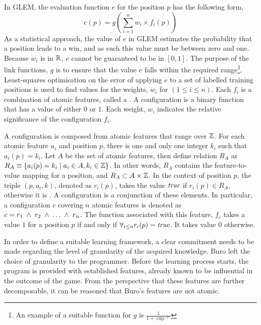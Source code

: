 In GLEM, the evaluation function $e$ for the position $p$  has the following form,
\[
e(p) = g(\sum_{i=1}^n w_i \times f_i(p))
\]
As a statistical approach, the value of $e$ in GLEM estimates the probability that a position leads to a win, and as such this value must be between zero and one.  Because $w_i$ is in ${\mathbb R}$, $e$ cannot be guaranteed to be in $[0,1]$. The purpose of the link functions, $g$ is to ensure that the value $e$ falls within the required range\footnote{An example of a suitable function for $g$ is $\frac{1} {1+\exp^{-x}}$}. Least-squares optimisation on the error of applying $e$  to a set of labelled training positions is used to find values for the weights, $w_i$ for $(1 \leq i \leq n)$. Each $f_i$ is a combination of atomic features, called a .  A configuration is a binary function that has a value of either $0$ or $1$.  Each weight, $w_i$ indicates the relative significance of the configuration $f_i$.  

A configuration is composed from atomic features that range over  $\mathbb Z$. For each atomic feature $a_i$ and position $p$, there is one and only one integer $k_i$ such that  $a_i(p) = k_i$.  Let $A$ be the set of atomic features, then define relation $R_A$ as $R_A \equiv \{ a_i(p) = k_i \; | \; a_i  \in A, k_i \in \mathbb Z\}$. In other words, $R_A$ contains the feature-to-value mapping for a position, and $R_A \subset A \times \mathbb Z$. In the context of  position $p$, the \label{glem_triple} triple $(p,a_i,k)$, denoted as $r_i(p)$, takes the value $\mbox{\it true}$  if $r_i(p) \in R_A$, otherwise it is \myfalse.  A configuration  is a conjunction of these elements.  In particular, a configuration $c$ covering $n$ atomic features is denoted as $c =  r_1 \;\wedge\;  r_2 \;\wedge\; \ldots \;\wedge\; r_n$.   The function associated with this feature, $f_c$ takes a value $1$ for a position $p$ if and only if $\forall_{i\leq n} r_i(p) = \mbox{\mbox{\it true}}$.  It takes value $0$ otherwise. 

In order to define a suitable learning framework, a clear commitment needs to be made regarding the level of granularity of the acquired knowledge. Buro left the choice of granularity to the programmer. Before the learning process starts, the program is provided with established features, already known to be influential in the outcome of the game.  From the perspective that these features are further decomposable, it can be reasoned that Buro's features are not atomic. 


